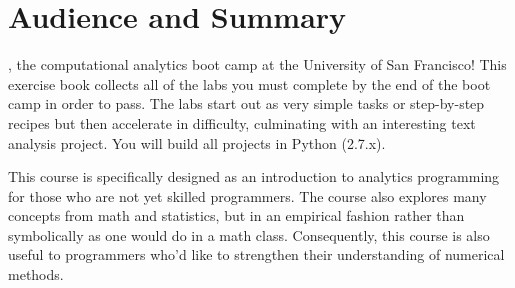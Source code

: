 \chapter{Audience and Summary}


, the computational analytics boot camp at the University of San Francisco! This exercise book collects all of the labs you must complete by the end of the boot camp in order to pass.  The labs start out as very simple tasks or step-by-step recipes but then accelerate in difficulty, culminating with an interesting text analysis project. You will build all projects in Python (2.7.x).

This course is specifically designed as an introduction to analytics programming for those who are not yet skilled programmers. The course also explores many concepts from math and statistics, but in an empirical fashion rather than symbolically as one would do in a math class. Consequently, this course is also useful to programmers who'd like to strengthen their understanding of numerical methods.

